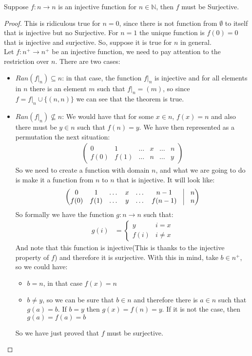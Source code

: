 \documentclass{tufte-handout}
\begin{document}
\begin{theorem}
	Suppose $f: n \to n$ is an injective function for $n \in \mathbb{N}$, then $f$ must be Surjective.
\end{theorem}
\begin{proof}
	This is ridiculous true for $n = 0$, since there is not function from $\emptyset$ to itself that is injective but no Surjective. For $n = 1$ the unique function is $f(0) = 0$ that is injective and surjective. So, suppose it is true for $n$ in general.\\

	Let $f: n^+ \to n^+$ be an injective function, we need to pay attention to the restriction over $n$. There are two cases:
	\begin{itemize}
		\item $Ran(f|_n) \subseteq n$: in that case, the function $f|_n$ is injective and for all elements in $n$ there is an element $m$ such that $f|_n = (m)$, so since $f = f|_n \cup \{(n, n)\}$ we can see that the theorem is true.
		\item $Ran(f|_n)\not \subseteq n$: We would have that for some $x \in n$, $f(x) = n$ and also there must be $y \in n$ such that $f(n) = y$. We have then represented as a permutation the next situation:
		\begin{align*}
			\begin{pmatrix}
				0 & 1 & \dots & x & \dots & n\\
				f(0) & f(1)& \dots & n & \dots & y
			\end{pmatrix}
		\end{align*}
		So we need to create a function with domain $n$, and what we are going to do is make it a function from $n$ to $n$ that is injective. It will look like:
		\begin{align*}
			\begin{pmatrix}
				0 & 1 & \dots & x & \dots & n-1 & \vline & n\\
				f(0) & f(1) & \dots & y &\dots & f(n-1) & \vline& n
			\end{pmatrix}
		\end{align*}
		So formally we have the function $g: n \to n$ such that:
		\begin{align*}
			g(i) &= \begin{cases}
				y & i = x\\
				f(i) & i \neq x
			\end{cases}
		\end{align*}
		And note that this function is injective(This is thanks to the injective property of $f$) and therefore it is surjective. With this in mind, take $b \in n^+$, so we could have:
		\begin{itemize}
			\item $b = n$, in that case $f(x) = n$
			\item $b \neq y$, so we can be sure that $b \in n$ and therefore there is $a \in n$ such that $g(a) = b$. If $b = y$ then $g(x) = f(n) = y$. If it is not the case, then $g(a) = f(a) = b$ 
		\end{itemize}
		So we have just proved that $f$ must be surjective.
	\end{itemize}
\end{proof}
\end{document}
